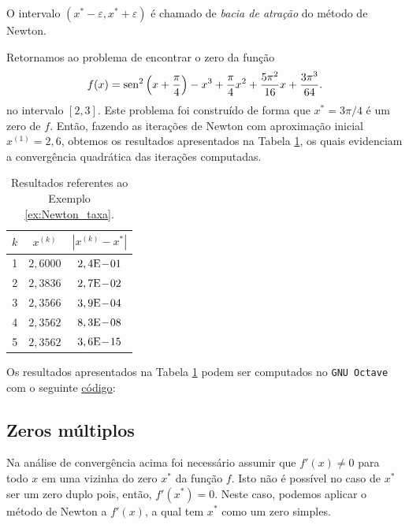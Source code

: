 \begin{obs}
  O intervalo $(x^*-\varepsilon, x^*+\varepsilon)$ é chamado de \emph{bacia de atração} do método de Newton.
\end{obs}

\begin{ex}\label{ex:Newton_taxa}
  Retornamos ao problema de encontrar o zero da função
  \begin{equation}
    f(x) = \operatorname{sen}^2\left(x+\frac{\pi}{4}\right) - x^3 + \frac{\pi}{4}x^2 + \frac{5\pi^2}{16}x + \frac{3\pi^3}{64}.
  \end{equation}
  no intervalo $[2,3]$. Este problema foi construído de forma que $x^* = 3\pi/4$ é um zero de $f$. Então, fazendo as iterações de Newton com aproximação inicial $x^{(1)}=2,6$, obtemos os resultados apresentados na Tabela \ref{tab:ex_Newton_taxa}, os quais evidenciam a convergência quadrática das iterações computadas.

\begin{table}[h!]
  \centering
  \caption{Resultados referentes ao Exemplo \ref{ex:Newton_taxa}.}
  \label{tab:ex_Newton_taxa}
  \begin{tabular}{r|cc}
    $k$ & $x^{(k)}$ & $|x^{(k)}-x^*|$ \\\hline
    1 & $2,6000$ & $2,4\mathrm{E}\!-\!01$ \\
    2 & $2,3836$ & $2,7\mathrm{E}\!-\!02$ \\
    3 & $2,3566$ & $3,9\mathrm{E}\!-\!04$ \\
    4 & $2,3562$ & $8,3\mathrm{E}\!-\!08$ \\
    5 & $2,3562$ & $3,6\mathrm{E}\!-\!15$ \\\hline
  \end{tabular}
\end{table}

\ifisoctave
Os resultados apresentados na Tabela \ref{tab:ex_Newton_taxa} podem ser computados no \verb+GNU Octave+ com o seguinte \href{https://github.com/phkonzen/notas/blob/master/src/MatematicaNumerica/cap_eq1d/dados/ex_Newton_taxa/ex_Newton_taxa.m}{código}:

\fi
\end{ex}

\subsection{Zeros múltiplos}

Na análise de convergência acima foi necessário assumir que $f'(x) \neq 0$ para todo $x$ em uma vizinha do zero $x^*$ da função $f$. Isto não é possível no caso de $x^*$ ser um zero duplo pois, então, $f'(x^*) = 0$. Neste caso, podemos aplicar o método de Newton a $f'(x)$, a qual tem $x^*$ como um zero simples.

